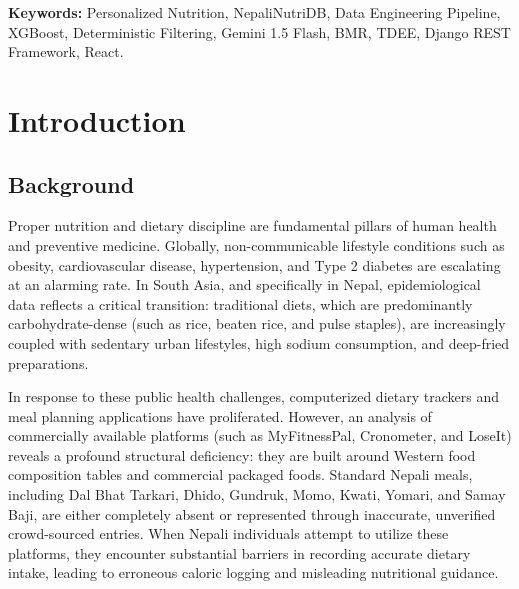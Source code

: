 \documentclass[12pt,a4paper]{report}
\begin{document}
\vspace{0.4cm}
\noindent\textbf{Keywords:} Personalized Nutrition, NepaliNutriDB, Data Engineering Pipeline, XGBoost, Deterministic Filtering, Gemini 1.5 Flash, BMR, TDEE, Django REST Framework, React.

\newpage

\tableofcontents
\thispagestyle{plain}
\newpage

\listoftables
{}
\thispagestyle{plain}
\newpage

\listoffigures
{}
\thispagestyle{plain}
\newpage

\chapter{Introduction}

\section{Background}

Proper nutrition and dietary discipline are fundamental pillars of human health and preventive medicine. Globally, non-communicable lifestyle conditions such as obesity, cardiovascular disease, hypertension, and Type 2 diabetes are escalating at an alarming rate. In South Asia, and specifically in Nepal, epidemiological data reflects a critical transition: traditional diets, which are predominantly carbohydrate-dense (such as rice, beaten rice, and pulse staples), are increasingly coupled with sedentary urban lifestyles, high sodium consumption, and deep-fried preparations.

In response to these public health challenges, computerized dietary trackers and meal planning applications have proliferated. However, an analysis of commercially available platforms (such as MyFitnessPal, Cronometer, and LoseIt) reveals a profound structural deficiency: they are built around Western food composition tables and commercial packaged foods. Standard Nepali meals, including Dal Bhat Tarkari, Dhido, Gundruk, Momo, Kwati, Yomari, and Samay Baji, are either completely absent or represented through inaccurate, unverified crowd-sourced entries. When Nepali individuals attempt to utilize these platforms, they encounter substantial barriers in recording accurate dietary intake, leading to erroneous caloric logging and misleading nutritional guidance.
\end{document}
